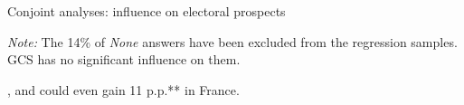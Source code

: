 \begin{framefont}{\small}
\begin{frame}{Conjoint analyses: influence on electoral prospects\label{}} 
    \begin{table}[h]\label{tab:list_exp}\vspace*{-.2cm}
        \pause
        \caption{Imagine if the [Democratic and Republican presidential candidates in 2024] campaigned with the following policies in their platforms. [Credible Progressive and Conservative platforms] \\ %
        Which of these candidates would you vote for? \textit{A; B; None of them} \\
        ~[FR: second round of presidential; DE, ES, UK: two favorite candidates in one's constituency]} %
        \makebox[\textwidth][c]{}
        {\footnotesize \textit{Note:} The 14\% of \textit{None} answers have been excluded from the regression samples. GCS has no significant influence on them. }
      \end{table} \vspace*{-.2cm}
      \bbvs \ip {}, and could even gain 11 p.p.** in France.
      \ee
\end{frame}


\end{framefont}
